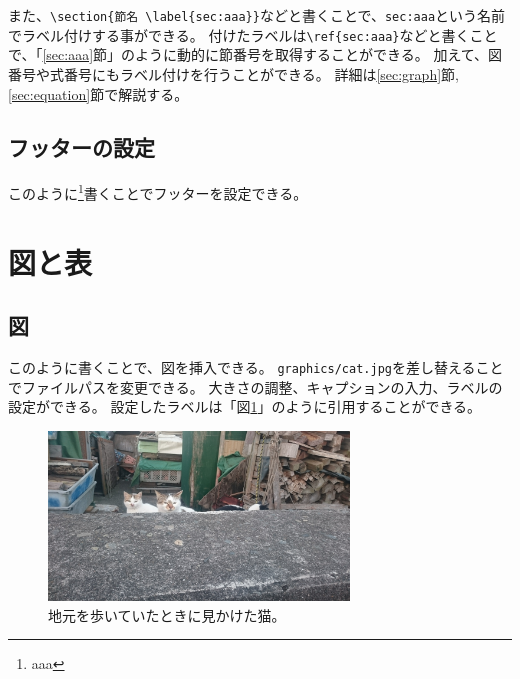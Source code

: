 \documentclass[uplatex, a4paper,twocolumn, 14pt]{jsarticle}
\begin{document}
また、\verb|\section{節名 \label{sec:aaa}}|などと書くことで、\verb|sec:aaa|という名前でラベル付けする事ができる。
付けたラベルは\verb|\ref{sec:aaa}|などと書くことで、「\ref{sec:aaa}節」のように動的に節番号を取得することができる。
加えて、図番号や式番号にもラベル付けを行うことができる。
詳細は\ref{sec:graph}節, \ref{sec:equation}節で解説する。

\subsection{フッターの設定}
このように\footnote{aaa}書くことでフッターを設定できる。



\section{図と表}

\subsection{図 \label{sec:graph}}

このように書くことで、図を挿入できる。
\verb|graphics/cat.jpg|を差し替えることでファイルパスを変更できる。
大きさの調整、キャプションの入力、ラベルの設定ができる。
設定したラベルは「図\ref{graph:cat}」のように引用することができる。

\begin{figure}[tbh]
    \begin{center}
        \includegraphics[width=8cm]{graphics/cat.jpg}
        \caption{
            地元を歩いていたときに見かけた猫。
        }
        \label{graph:cat}
    \end{center}
\end{figure}

\end{document}

